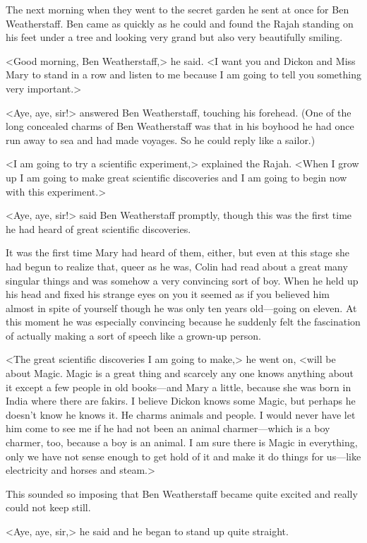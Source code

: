 The next morning when they went to the secret garden he sent at once for Ben Weatherstaff. Ben came as quickly as he could and found the Rajah standing on his feet under a tree and looking very grand but also very beautifully smiling.

<Good morning, Ben Weatherstaff,> he said. <I want you and Dickon and Miss Mary to stand in a row and listen to me because I am going to tell you something very important.>

<Aye, aye, sir!> answered Ben Weatherstaff, touching his forehead. (One of the long concealed charms of Ben Weatherstaff was that in his boyhood he had once run away to sea and had made voyages. So he could reply like a sailor.)

<I am going to try a scientific experiment,> explained the Rajah. <When I grow up I am going to make great scientific discoveries and I am going to begin now with this experiment.>

<Aye, aye, sir!> said Ben Weatherstaff promptly, though this was the first time he had heard of great scientific discoveries.

It was the first time Mary had heard of them, either, but even at this stage she had begun to realize that, queer as he was, Colin had read about a great many singular things and was somehow a very convincing sort of boy. When he held up his head and fixed his strange eyes on you it seemed as if you believed him almost in spite of yourself though he was only ten years old—going on eleven. At this moment he was especially convincing because he suddenly felt the fascination of actually making a sort of speech like a grown-up person.

<The great scientific discoveries I am going to make,> he went on, <will be about Magic. Magic is a great thing and scarcely any one knows anything about it except a few people in old books—and Mary a little, because she was born in India where there are fakirs. I believe Dickon knows some Magic, but perhaps he doesn't know he knows it. He charms animals and people. I would never have let him come to see me if he had not been an animal charmer—which is a boy charmer, too, because a boy is an animal. I am sure there is Magic in everything, only we have not sense enough to get hold of it and make it do things for us—like electricity and horses and steam.>

This sounded so imposing that Ben Weatherstaff became quite excited and really could not keep still.

<Aye, aye, sir,> he said and he began to stand up quite straight.


